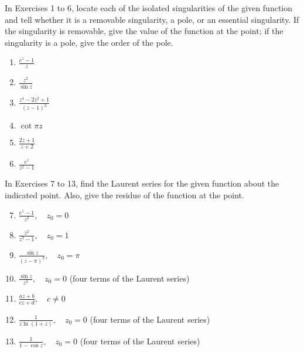 \documentclass[12pt]{article}
\theoremstyle{definition} %
\theoremstyle{plain} %
\begin{document}
In Exercises 1 to 6, locate each of the isolated singularities of the given function and tell whether it is a removable singularity, a pole, or an essential singularity. If the singularity is removable, give the value of the function at the point; if the singularity is a pole, give the order of the pole.
\begin{enumerate}
    \item $\frac{e^z - 1}{z}$
    \item $\frac{z^2}{\sin z}$
    \item $\frac{z^4 - 2z^2 + 1}{(z - 1)^2}$
    \item $\cot \pi z$
    \item $\frac{2z + 1}{z + 2}$
    \item $\frac{e^z}{z^2 - 1}$
\end{enumerate}

In Exercises 7 to 13, find the Laurent series for the given function about the indicated point. Also, give the residue of the function at the point.
\begin{enumerate}
    \setcounter{enumi}{6}
    \item $\frac{e^z - 1}{z^2}, \quad z_0 = 0$
    \item $\frac{z^2}{z^3 - 1}, \quad z_0 = 1$
    \item $\frac{\sin z}{(z - \pi)^2}, \quad z_0 = \pi$
    \item $\frac{\sin z}{z^2}, \quad z_0 = 0$ (four terms of the Laurent series)
    \item $\frac{az + b}{cz + d}, \quad c \ne 0$
    \item $\frac{1}{z \ln(1 + z)}, \quad z_0 = 0$ (four terms of the Laurent series)
    \item $\frac{1}{1 - \cos z}, \quad z_0 = 0$ (four terms of the Laurent series)
\end{enumerate}
\end{document}
